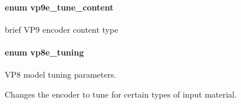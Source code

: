 \paragraph[{\texorpdfstring{vp9e\+\_\+tune\+\_\+content}{vp9e_tune_content}}]{\setlength{\rightskip}{0pt plus 5cm}enum {\bf vp9e\+\_\+tune\+\_\+content}}\hypertarget{group__vp8__encoder_ga76d4298d5ee58718597f307a290211a9}{}\label{group__vp8__encoder_ga76d4298d5ee58718597f307a290211a9}
brief V\+P9 encoder content type 
\paragraph[{\texorpdfstring{vp8e\+\_\+tuning}{vp8e_tuning}}]{\setlength{\rightskip}{0pt plus 5cm}enum {\bf vp8e\+\_\+tuning}}\hypertarget{group__vp8__encoder_ga371dbc29054b3d46364af996ad42ab94}{}\label{group__vp8__encoder_ga371dbc29054b3d46364af996ad42ab94}


V\+P8 model tuning parameters. 

Changes the encoder to tune for certain types of input material. 